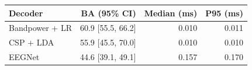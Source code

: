 \begin{tabular}{lrrr}
\toprule
Decoder & BA (95\% CI) & Median (ms) & P95 (ms) \\
\midrule
Bandpower + LR & 60.9 [55.5, 66.2] & 0.010 & 0.011 \\
CSP + LDA & 55.9 [45.5, 70.0] & 0.010 & 0.010 \\
EEGNet & 44.6 [39.1, 49.1] & 0.157 & 0.170 \\
\bottomrule
\end{tabular}
